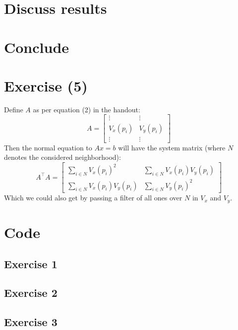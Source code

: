 \documentclass{article}
\begin{document}
\section{Discuss results}

\section{Conclude}






\section{Exercise (5)}
Define $A$ as per equation (2) in the handout:
\begin{equation}
    A = \begin{bmatrix}
    \vdots & \vdots \\
    V_{x}(p_i) & V_{y}(p_i) \\
    \vdots & \vdots
    \end{bmatrix}
\end{equation}
Then the normal equation to $Ax = b$ will have the system matrix (where $N$ denotes the considered neighborhood):
\begin{equation}
    A^\intercal A = \begin{bmatrix}
        \sum_{i \in N} V_{x}(p_i)^{2} & \sum_{i \in N} V_{x}(p_i)V_{y}(p_i) \\
        \sum_{i \in N} V_{x}(p_i)V_{y}(p_i) & \sum_{i \in N} V_{y}(p_i)^{2}
    \end{bmatrix}
\end{equation}
Which we could also get by passing a filter of all ones over $N$ in $V_x$ and $V_y$.

\newpage
\appendix
\section{Code}
\subsection{Exercise 1}


\subsection{Exercise 2}


\subsection{Exercise 3}

\end{document}
